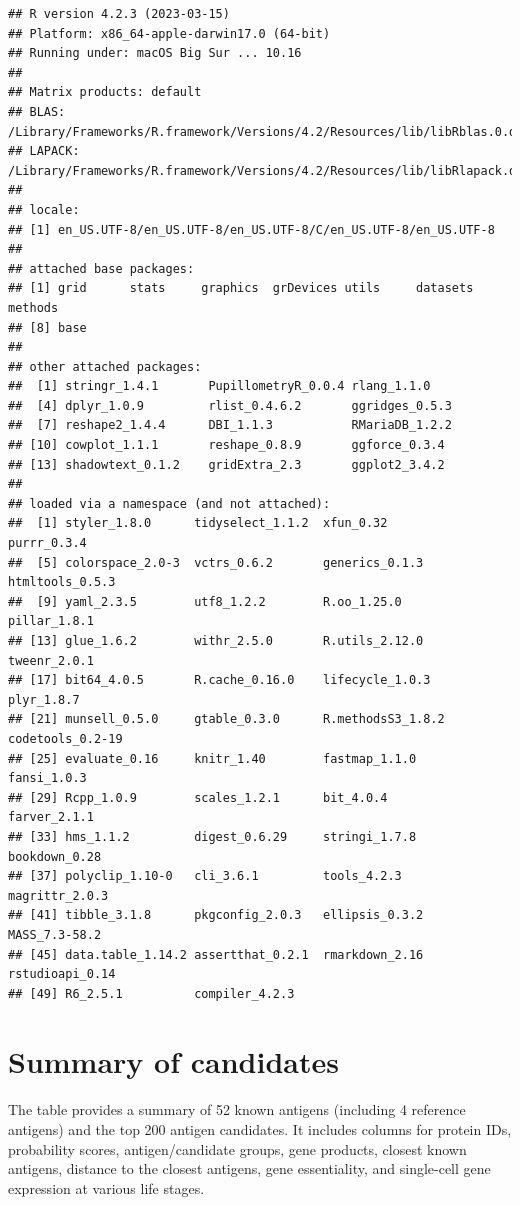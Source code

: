 \documentclass[
  11pt,
  oneside]{book}
\begin{document}
\begin{verbatim}
## R version 4.2.3 (2023-03-15)
## Platform: x86_64-apple-darwin17.0 (64-bit)
## Running under: macOS Big Sur ... 10.16
## 
## Matrix products: default
## BLAS:   /Library/Frameworks/R.framework/Versions/4.2/Resources/lib/libRblas.0.dylib
## LAPACK: /Library/Frameworks/R.framework/Versions/4.2/Resources/lib/libRlapack.dylib
## 
## locale:
## [1] en_US.UTF-8/en_US.UTF-8/en_US.UTF-8/C/en_US.UTF-8/en_US.UTF-8
## 
## attached base packages:
## [1] grid      stats     graphics  grDevices utils     datasets  methods  
## [8] base     
## 
## other attached packages:
##  [1] stringr_1.4.1       PupillometryR_0.0.4 rlang_1.1.0        
##  [4] dplyr_1.0.9         rlist_0.4.6.2       ggridges_0.5.3     
##  [7] reshape2_1.4.4      DBI_1.1.3           RMariaDB_1.2.2     
## [10] cowplot_1.1.1       reshape_0.8.9       ggforce_0.3.4      
## [13] shadowtext_0.1.2    gridExtra_2.3       ggplot2_3.4.2      
## 
## loaded via a namespace (and not attached):
##  [1] styler_1.8.0      tidyselect_1.1.2  xfun_0.32         purrr_0.3.4      
##  [5] colorspace_2.0-3  vctrs_0.6.2       generics_0.1.3    htmltools_0.5.3  
##  [9] yaml_2.3.5        utf8_1.2.2        R.oo_1.25.0       pillar_1.8.1     
## [13] glue_1.6.2        withr_2.5.0       R.utils_2.12.0    tweenr_2.0.1     
## [17] bit64_4.0.5       R.cache_0.16.0    lifecycle_1.0.3   plyr_1.8.7       
## [21] munsell_0.5.0     gtable_0.3.0      R.methodsS3_1.8.2 codetools_0.2-19 
## [25] evaluate_0.16     knitr_1.40        fastmap_1.1.0     fansi_1.0.3      
## [29] Rcpp_1.0.9        scales_1.2.1      bit_4.0.4         farver_2.1.1     
## [33] hms_1.1.2         digest_0.6.29     stringi_1.7.8     bookdown_0.28    
## [37] polyclip_1.10-0   cli_3.6.1         tools_4.2.3       magrittr_2.0.3   
## [41] tibble_3.1.8      pkgconfig_2.0.3   ellipsis_0.3.2    MASS_7.3-58.2    
## [45] data.table_1.14.2 assertthat_0.2.1  rmarkdown_2.16    rstudioapi_0.14  
## [49] R6_2.5.1          compiler_4.2.3
\end{verbatim}

\hypertarget{06_summary_of_candidates}{%
\chapter{Summary of candidates}\label{06_summary_of_candidates}}

The table provides a summary of 52 known antigens (including 4 reference antigens) and the top 200 antigen candidates. It includes columns for protein IDs, probability scores, antigen/candidate groups, gene products, closest known antigens, distance to the closest antigens, gene essentiality, and single-cell gene expression at various life stages.
\end{document}
